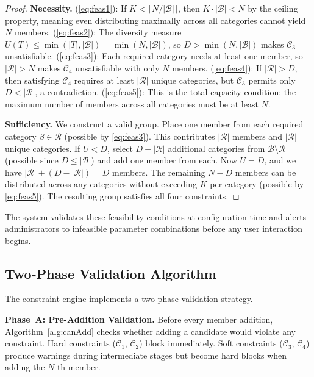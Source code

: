 \documentclass[11pt,a4paper]{article}
\theoremstyle{plain}
\theoremstyle{definition}
\begin{document}
\begin{proof}
\textbf{Necessity.}
(\ref{eq:feas1}): If $K < \lceil N/|\mathcal{B}| \rceil$, then $K \cdot |\mathcal{B}| < N$ by the ceiling property, meaning even distributing maximally across all categories cannot yield $N$ members.
(\ref{eq:feas2}): The diversity measure $U(T) \leq \min(|T|, |\mathcal{B}|) = \min(N, |\mathcal{B}|)$, so $D > \min(N, |\mathcal{B}|)$ makes $\mathcal{C}_3$ unsatisfiable.
(\ref{eq:feas3}): Each required category needs at least one member, so $|\mathcal{R}| > N$ makes $\mathcal{C}_4$ unsatisfiable with only $N$ members.
(\ref{eq:feas4}): If $|\mathcal{R}| > D$, then satisfying $\mathcal{C}_4$ requires at least $|\mathcal{R}|$ unique categories, but $\mathcal{C}_3$ permits only $D < |\mathcal{R}|$, a contradiction.
(\ref{eq:feas5}): This is the total capacity condition: the maximum number of members across all categories must be at least $N$.

\textbf{Sufficiency.}
We construct a valid group. Place one member from each required category $\beta \in \mathcal{R}$ (possible by \ref{eq:feas3}). This contributes $|\mathcal{R}|$ members and $|\mathcal{R}|$ unique categories. If $U < D$, select $D - |\mathcal{R}|$ additional categories from $\mathcal{B} \setminus \mathcal{R}$ (possible since $D \leq |\mathcal{B}|$) and add one member from each. Now $U = D$, and we have $|\mathcal{R}| + (D - |\mathcal{R}|) = D$ members. The remaining $N - D$ members can be distributed across any categories without exceeding $K$ per category (possible by \ref{eq:feas5}). The resulting group satisfies all four constraints.
\end{proof}

The system validates these feasibility conditions at configuration time and alerts administrators to infeasible parameter combinations before any user interaction begins.

\subsection{Two-Phase Validation Algorithm}

The constraint engine implements a two-phase validation strategy.

\textbf{Phase~A: Pre-Addition Validation.} Before every member addition, Algorithm~\ref{alg:canAdd} checks whether adding a candidate would violate any constraint. Hard constraints ($\mathcal{C}_1$, $\mathcal{C}_2$) block immediately. Soft constraints ($\mathcal{C}_3$, $\mathcal{C}_4$) produce warnings during intermediate stages but become hard blocks when adding the $N$-th member.
\end{document}
